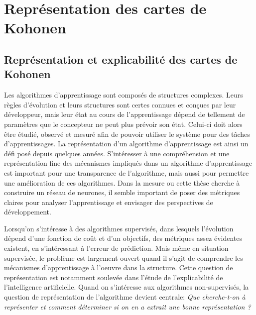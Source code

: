 \chapter{Représentation des cartes de Kohonen}
\graphicspath{{03-Representation/}}

\minitoc
\section{Représentation et explicabilité des cartes de Kohonen}

Les algorithmes d'apprentissage sont composés de structures complexes. Leurs règles d'évolution et leurs structures sont certes connues et conçues par leur développeur, mais leur état au cours de l'apprentissage dépend de tellement de paramètres que le concepteur ne peut plus prévoir son état. Celui-ci doit alors être étudié, observé et mesuré afin de pouvoir utiliser le système pour des tâches d'apprentissages. La représentation d'un algorithme d'apprentissage est ainsi un défi posé depuis quelques années. S'intéresser à une compréhension et une représentation fine des mécanismes impliqués dans un algorithme d'apprentissage est important pour une transparence de l'algorithme, mais aussi pour permettre une amélioration de ces algorithmes. Dans la mesure ou cette thèse cherche à construire un réseau de neurones, il semble important de poser des métriques claires pour analyser l'apprentissage et envisager des perspectives de développement. 

Lorsqu'on s'intéresse à des algorithmes supervisés, dans lesquels l'évolution dépend d'une fonction de coût et d'un objectifs, des métriques assez évidentes existent, en s'intéressant à l'erreur de prédiction. Mais même en situation supervisée, le problème est largement ouvert quand il s'agit de comprendre les mécanismes d'apprentissage à l'oeuvre dans la structure. Cette question de représentation est notamment soulevée dans l'étude de l'explicabilité de l'intelligence artificielle. Quand on s'intéresse aux algorithmes non-supervisés, la question de représentation de l'algorithme devient centrale: \emph{Que cherche-t-on à représenter et comment déterminer si on en a extrait une bonne représentation ?}

%


